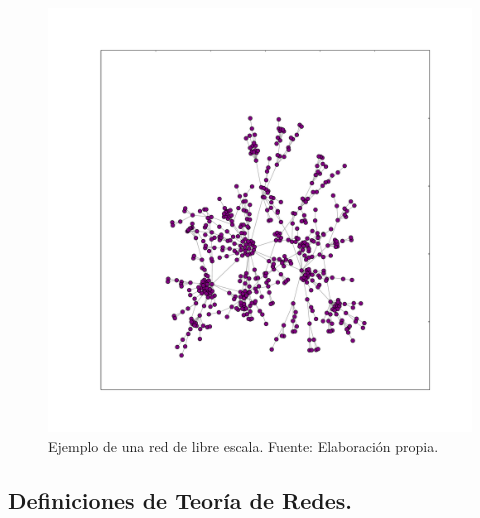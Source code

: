 \documentclass[../main.tex]{subfiles}
\begin{document}
\begin{figure}[h!]
    \centering
    \includegraphics[scale = 0.35]{images/marcoteorico_barabasi.pdf}
    \caption{Ejemplo de una red de libre escala. Fuente: Elaboración propia.}
    \label{fig:marcoteorico_scale_free}
\end{figure}




\newpage
\subsection{Definiciones de Teoría de Redes.}
\end{document}
